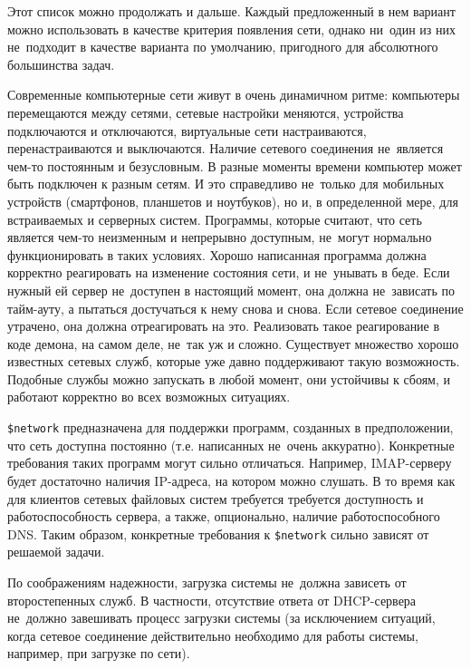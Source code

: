 \documentclass[10pt,oneside,a4paper]{article}
\begin{document}
Этот список можно продолжать и дальше. Каждый предложенный в нем вариант можно
использовать в качестве критерия появления сети, однако ни~один из них
не~подходит в качестве варианта по умолчанию, пригодного для абсолютного
большинства задач.

Современные компьютерные сети живут в очень динамичном ритме: компьютеры
перемещаются между сетями, сетевые настройки меняются, устройства подключаются и
отключаются, виртуальные сети настраиваются, перенастраиваются и выключаются.
Наличие сетевого соединения не~является чем-то постоянным и безусловным. В
разные моменты времени компьютер может быть подключен к разным сетям. И это
справедливо не~только для мобильных устройств (смартфонов, планшетов и
ноутбуков), но и, в определенной мере, для встраиваемых и серверных систем. 
Программы, которые считают, что сеть является чем-то неизменным и непрерывно
доступным, не~могут нормально функционировать в таких условиях. Хорошо
написанная программа должна корректно реагировать на изменение состояния сети, и
не~унывать в беде. Если нужный ей сервер не~доступен в настоящий момент, она
должна не~зависать по тайм-ауту, а пытаться достучаться к нему снова и снова.
Если сетевое соединение утрачено, она должна отреагировать на это. Реализовать
такое реагирование в коде демона, на самом деле, не~так уж и сложно. Существует
множество хорошо известных сетевых служб, которые уже давно поддерживают такую
возможность. Подобные службы можно запускать в любой момент, они устойчивы к
сбоям, и работают корректно во всех возможных ситуациях.

\verb+$network+ предназначена для поддержки программ, созданных в
предположении, что сеть доступна постоянно (т.е. написанных не~очень аккуратно).
Конкретные требования таких программ могут сильно отличаться. Например,
IMAP-серверу будет достаточно наличия IP-адреса, на котором можно слушать. В то
время как для клиентов сетевых файловых систем требуется требуется доступность и
работоспособность сервера, а также, опционально, наличие работоспособного DNS.
Таким образом, конкретные требования к \verb+$network+ сильно зависят от
решаемой задачи.

По соображениям надежности, загрузка системы не~должна зависеть от второстепенных
служб. В частности, отсутствие ответа от DHCP-сервера не~должно завешивать
процесс загрузки системы (за исключением ситуаций, когда сетевое соединение
действительно необходимо для работы системы, например, при загрузке по сети).
\end{document}
